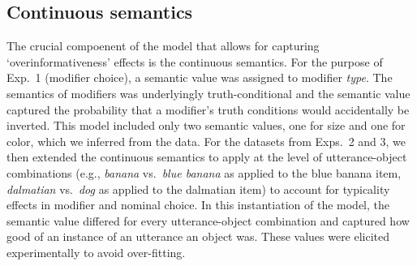 \documentclass[11pt]{article}
\newcommand{\red}[1]{\textcolor{Red}{#1}}
\newcommand{\tableref}[1]{Table \ref{#1}}
\begin{document}
%

\subsection{Continuous semantics}

The crucial compoenent of the model that allows for capturing `overinformativeness' effects is the continuous semantics.  For the purpose of Exp.~1 (modifier choice), a semantic value was assigned to modifier \emph{type}. The semantics of modifiers was underlyingly truth-conditional and the semantic value captured the probability that a modifier's truth conditions would accidentally be inverted. This model included only two semantic values, one for size and one for color, which we inferred from the data. For the datasets from Exps.~2 and 3, we then extended the continuous semantics to apply at the level of utterance-object  combinations (e.g., \emph{banana} vs.~\emph{blue banana} as applied to the blue banana item, \emph{dalmatian} vs.~\emph{dog} as applied to the dalmatian item) to account for typicality effects in modifier and nominal choice. In this instantiation of the model, the semantic value differed for every utterance-object combination and captured how good of an instance of an utterance an object was. These values were elicited experimentally to avoid over-fitting. %

\end{document}
